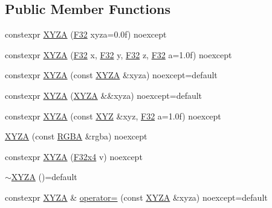 \subsection*{Public Member Functions}
\begin{DoxyCompactItemize}
\item 
constexpr \mbox{\hyperlink{structmage_1_1_x_y_z_a_ab954075ab032465c9199870646a2718b}{X\+Y\+ZA}} (\mbox{\hyperlink{namespacemage_aa97e833b45f06d60a0a9c4fc22ae02c0}{F32}} xyza=0.\+0f) noexcept
\item 
constexpr \mbox{\hyperlink{structmage_1_1_x_y_z_a_abe082fe71a6b7f7a855b65f5491e24d6}{X\+Y\+ZA}} (\mbox{\hyperlink{namespacemage_aa97e833b45f06d60a0a9c4fc22ae02c0}{F32}} x, \mbox{\hyperlink{namespacemage_aa97e833b45f06d60a0a9c4fc22ae02c0}{F32}} y, \mbox{\hyperlink{namespacemage_aa97e833b45f06d60a0a9c4fc22ae02c0}{F32}} z, \mbox{\hyperlink{namespacemage_aa97e833b45f06d60a0a9c4fc22ae02c0}{F32}} a=1.\+0f) noexcept
\item 
constexpr \mbox{\hyperlink{structmage_1_1_x_y_z_a_a9fdc619e5081ac4ffd6f880ebe49311e}{X\+Y\+ZA}} (const \mbox{\hyperlink{structmage_1_1_x_y_z_a}{X\+Y\+ZA}} \&xyza) noexcept=default
\item 
constexpr \mbox{\hyperlink{structmage_1_1_x_y_z_a_ad5a2327287cd23d1e5bb1bb1b850affd}{X\+Y\+ZA}} (\mbox{\hyperlink{structmage_1_1_x_y_z_a}{X\+Y\+ZA}} \&\&xyza) noexcept=default
\item 
constexpr \mbox{\hyperlink{structmage_1_1_x_y_z_a_a0694b46dd33304f23ca21c0cde51783d}{X\+Y\+ZA}} (const \mbox{\hyperlink{structmage_1_1_x_y_z}{X\+YZ}} \&xyz, \mbox{\hyperlink{namespacemage_aa97e833b45f06d60a0a9c4fc22ae02c0}{F32}} a=1.\+0f) noexcept
\item 
\mbox{\hyperlink{structmage_1_1_x_y_z_a_a8571290c4ba9eaf9d33da17f30b8ac0f}{X\+Y\+ZA}} (const \mbox{\hyperlink{structmage_1_1_r_g_b_a}{R\+G\+BA}} \&rgba) noexcept
\item 
constexpr \mbox{\hyperlink{structmage_1_1_x_y_z_a_a6065beb34f7d2a3ac0a0838a96542aa6}{X\+Y\+ZA}} (\mbox{\hyperlink{namespacemage_a759aaad2fdc75aa93b5b614eb01712c4}{F32x4}} v) noexcept
\item 
\mbox{\hyperlink{structmage_1_1_x_y_z_a_a2f706527b01ff7e86099b76180ebd25f}{$\sim$\+X\+Y\+ZA}} ()=default
\item 
constexpr \mbox{\hyperlink{structmage_1_1_x_y_z_a}{X\+Y\+ZA}} \& \mbox{\hyperlink{structmage_1_1_x_y_z_a_a04a66bdc8e61c6b415e1b509f466bf50}{operator=}} (const \mbox{\hyperlink{structmage_1_1_x_y_z_a}{X\+Y\+ZA}} \&xyza) noexcept=default
\item 

\end{DoxyCompactItemize}

